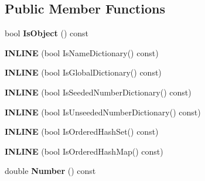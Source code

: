 \subsection*{Public Member Functions}
\begin{DoxyCompactItemize}
\item 
bool {\bfseries Is\+Object} () const \hypertarget{classv8_1_1internal_1_1_object_a5efae6627ad128aa31673a3ddff7eb88}{}\label{classv8_1_1internal_1_1_object_a5efae6627ad128aa31673a3ddff7eb88}

\item 
{\bfseries I\+N\+L\+I\+NE} (bool Is\+Name\+Dictionary() const)\hypertarget{classv8_1_1internal_1_1_object_a022811a4a620c7167242779473bb3694}{}\label{classv8_1_1internal_1_1_object_a022811a4a620c7167242779473bb3694}

\item 
{\bfseries I\+N\+L\+I\+NE} (bool Is\+Global\+Dictionary() const)\hypertarget{classv8_1_1internal_1_1_object_aa5f46db90d8a8ccf7aab3031e30c8697}{}\label{classv8_1_1internal_1_1_object_aa5f46db90d8a8ccf7aab3031e30c8697}

\item 
{\bfseries I\+N\+L\+I\+NE} (bool Is\+Seeded\+Number\+Dictionary() const)\hypertarget{classv8_1_1internal_1_1_object_a3f2cc2f35d751ed51dce8e64196d43b6}{}\label{classv8_1_1internal_1_1_object_a3f2cc2f35d751ed51dce8e64196d43b6}

\item 
{\bfseries I\+N\+L\+I\+NE} (bool Is\+Unseeded\+Number\+Dictionary() const)\hypertarget{classv8_1_1internal_1_1_object_a683f47b770c8468d1dacf09d82ea2093}{}\label{classv8_1_1internal_1_1_object_a683f47b770c8468d1dacf09d82ea2093}

\item 
{\bfseries I\+N\+L\+I\+NE} (bool Is\+Ordered\+Hash\+Set() const)\hypertarget{classv8_1_1internal_1_1_object_aafc8544f68c68c61767e4afb8ebd7258}{}\label{classv8_1_1internal_1_1_object_aafc8544f68c68c61767e4afb8ebd7258}

\item 
{\bfseries I\+N\+L\+I\+NE} (bool Is\+Ordered\+Hash\+Map() const)\hypertarget{classv8_1_1internal_1_1_object_a287586449fda9729a2a0da492bae1c0e}{}\label{classv8_1_1internal_1_1_object_a287586449fda9729a2a0da492bae1c0e}

\item 
double {\bfseries Number} () const \hypertarget{classv8_1_1internal_1_1_object_a3ab283557d4cdd7009ddd6152f6bef5e}{}\label{classv8_1_1internal_1_1_object_a3ab283557d4cdd7009ddd6152f6bef5e}


\end{DoxyCompactItemize}
